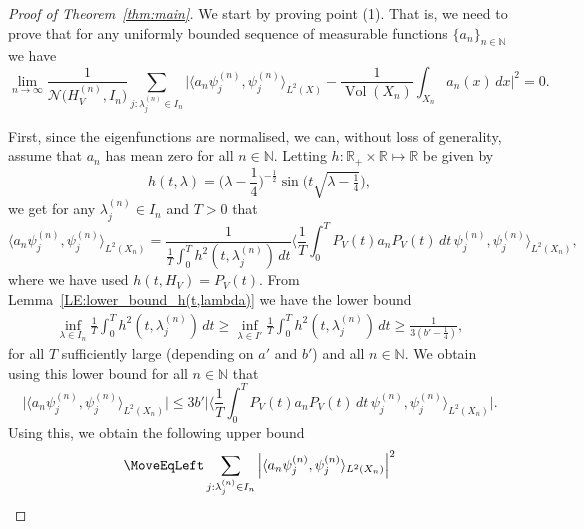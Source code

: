 \documentclass[11pt,twoside,reqno]{amsart}
\newcommand{\R}{\mathbb{R}}
\newcommand{\N}{\mathbb{N}}
\newcommand{\1}{\mathrm{\mathbf{1}}}
\DeclareMathOperator{\Vol}{Vol}
\numberwithin{equation}{section}
\theoremstyle{plain}
\theoremstyle{definition}
\theoremstyle{remark}
\begin{document}
\begin{proof}[Proof of Theorem~\ref{thm:main}]
We start by proving point (1). That is, we need to prove that for any uniformly bounded sequence of measurable functions $\{a_n\}_{n\in\N}$ we have
\begin{equation*}
        \lim_{n\rightarrow \infty}\frac{1}{\mathcal{N}\big(H_V^{(n)},I_n\big)} \sum_{j:\lambda_j^{(n)}\in I_n} \Big| \langle a_n \psi_j^{(n)} , \psi_j^{(n)}\rangle_{L^2(X)} - \frac{1}{\Vol(X_n)} \int_{X_n} a_n(x) \, dx \Big|^2 =0.
\end{equation*}
       
First, since the eigenfunctions are normalised, we can, without loss of generality, assume that $a_n$ has mean zero for all $n\in\N$. Letting $h:\R_+\times\R\mapsto\R$ be given by 
\begin{equation*}
    h(t,\lambda) = \big(\lambda - \frac{1}{4}\big)^{-\frac12}\sin\big(t\sqrt{\lambda - \tfrac{1}{4}}\big),
\end{equation*}
we get for any $\lambda_j^{(n)}\in I_n$ and $T>0$ that 
\begin{equation}
    \langle a_n \psi_j^{(n)} , \psi_j^{(n)}\rangle_{L^2(X_n)} = \frac{1}{\frac{1}{T} \int_0^T h^2(t,\lambda_j^{(n)}) \, d t}  \langle \frac{1}{T} \int_{0}^T P_V(t) a_n P_V(t) \, d t \, \psi_j^{(n)} , \psi_j^{(n)}\rangle_{L^2(X_n)},
\end{equation}
where we have used $h(t,H_V) = P_V(t)$. From Lemma~\ref{LE:lower_bound_h(t,lambda)} we have the lower bound
\begin{equation*}
    \begin{aligned}
    \inf_{\lambda \in I_n} \frac{1}{T} \int_0^T h^2(t,\lambda_j^{(n)}) \, d t \geq \inf_{\lambda \in I'} \frac{1}{T} \int_0^T h^2(t,\lambda_j^{(n)}) \, d t \geq \frac{1}{3(b'-\frac14)},
    \end{aligned}
\end{equation*}
for all $T$ sufficiently large (depending on $a'$ and $b'$) and all $n\in\N$. We obtain using this lower bound for all $n\in\N$ that 
\begin{equation}
    \Big|\langle a_n \psi_j^{(n)} , \psi_j^{(n)}\rangle_{L^2(X_n)}\Big| \leq  3b'  \Big|\langle \frac{1}{T} \int_{0}^T P_V(t) a_n P_V(t) \, d t \, \psi_j^{(n)} , \psi_j^{(n)}\rangle_{L^2(X_n)}\Big|.
\end{equation}
Using this, we obtain the following upper bound
\begin{equation}
    \begin{aligned}
    \MoveEqLeft \sum_{j:\lambda_j^{(n)}\in I_n} \Big| \langle a_n \psi_j^{(n)} , \psi_j^{(n)}\rangle_{L^2(X_n)}  \Big|^2 

\end{aligned}
\end{equation}
\end{proof}
\end{document}
